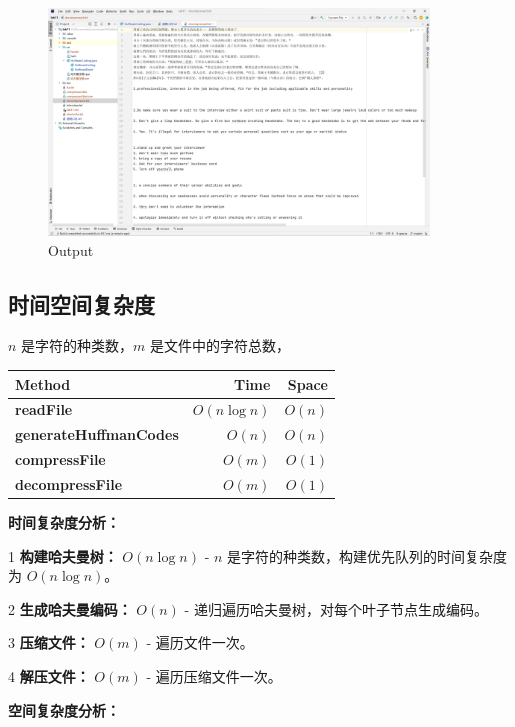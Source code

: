 \documentclass[UTF8]{ctexart}
\begin{document}
\begin{figure}[htbp] 
    \centering
    \includegraphics[width=0.9\textwidth]{output.png} %
    \caption{Output}
    \label{fig:Output}
\end{figure}

\subsection*{时间空间复杂度}

$n$ 是字符的种类数，$m$ 是文件中的字符总数，

\begin{center}
    \begin{tabular}{|l|r|r|} \hline
        Method & Time & Space \\\hline
        \textbf{readFile} & $O(n \log n)$ &  $O(n)$  \\
        \textbf{generateHuffmanCodes} & $O(n)$ & $O(n)$ \\
        \textbf{compressFile} & $O(m)$ & $O(1)$ \\ 
        \textbf{decompressFile} & $O(m)$ & $O(1)$ \\\hline
    \end{tabular}
\end{center}

\textbf{时间复杂度分析：}

1 \textbf{构建哈夫曼树：} $O(n \log n)$ - $n$ 是字符的种类数，构建优先队列的时间复杂度为 $O(n \log n)$。

2 \textbf{生成哈夫曼编码：} $O(n)$ - 递归遍历哈夫曼树，对每个叶子节点生成编码。

3 \textbf{压缩文件：} $O(m)$ - 遍历文件一次。

4 \textbf{解压文件：} $O(m)$ - 遍历压缩文件一次。

\textbf{空间复杂度分析：}
\end{document}

